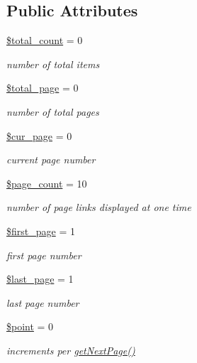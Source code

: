 \subsection*{Public Attributes}
\begin{DoxyCompactItemize}
\item 
\hyperlink{classPageHandler_ad0425a5e936db072a17956e4dada6f2b}{\$total\-\_\-count} = 0
\begin{DoxyCompactList}\small\item\em number of total items \end{DoxyCompactList}\item 
\hyperlink{classPageHandler_adfb101b1d69a89c65cbe405e5d2be0ad}{\$total\-\_\-page} = 0
\begin{DoxyCompactList}\small\item\em number of total pages \end{DoxyCompactList}\item 
\hyperlink{classPageHandler_acc2df2502fc0bcda4a9c9f9892e8581e}{\$cur\-\_\-page} = 0
\begin{DoxyCompactList}\small\item\em current page number \end{DoxyCompactList}\item 
\hyperlink{classPageHandler_a48a16aadd0c373c8856df7df954f90ff}{\$page\-\_\-count} = 10
\begin{DoxyCompactList}\small\item\em number of page links displayed at one time \end{DoxyCompactList}\item 
\hyperlink{classPageHandler_adee671fac811b630df2886a43108b5ff}{\$first\-\_\-page} = 1
\begin{DoxyCompactList}\small\item\em first page number \end{DoxyCompactList}\item 
\hyperlink{classPageHandler_ad0a035b1ac1f86fe173d5ea4e8c2bef7}{\$last\-\_\-page} = 1
\begin{DoxyCompactList}\small\item\em last page number \end{DoxyCompactList}\item 
\hyperlink{classPageHandler_a82a9b55cb98e79d46e6c6648cd2fca26}{\$point} = 0
\begin{DoxyCompactList}\small\item\em increments per \hyperlink{classPageHandler_a259d01838d005d854d4cc263ba524de7}{get\-Next\-Page()} \end{DoxyCompactList}\end{DoxyCompactItemize}


